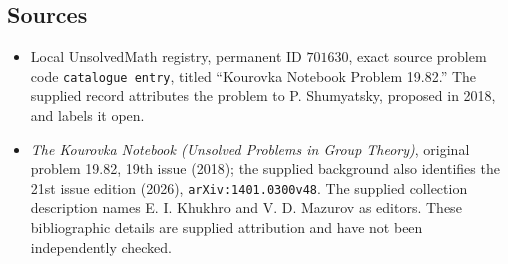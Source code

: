 \documentclass[11pt]{article}
\begin{document}
\subsection{Sources}
\begin{itemize}
\item Local UnsolvedMath registry, permanent ID \(701630\), exact source problem code \texttt{catalogue entry}, titled ``Kourovka Notebook Problem 19.82.'' The supplied record attributes the problem to P. Shumyatsky, proposed in 2018, and labels it open.
\item \emph{The Kourovka Notebook (Unsolved Problems in Group Theory)}, original problem 19.82, 19th issue (2018); the supplied background also identifies the 21st issue edition (2026), \texttt{arXiv:1401.0300v48}. The supplied collection description names E. I. Khukhro and V. D. Mazurov as editors. These bibliographic details are supplied attribution and have not been independently checked.
\end{itemize}
\end{document}

